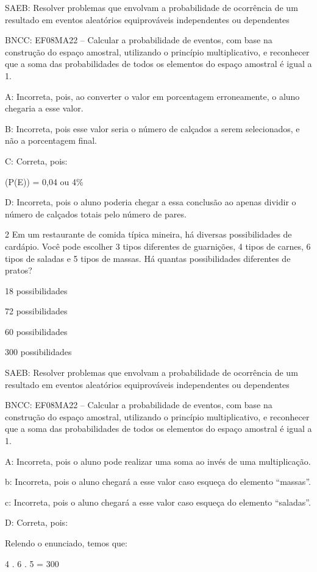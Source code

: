 {SAEB: Resolver problemas que envolvam a probabilidade de ocorrência de
um resultado em eventos aleatórios equiprováveis independentes ou
dependentes

BNCC: EF08MA22 -- Calcular a probabilidade de eventos, com base na
construção do espaço amostral, utilizando o princípio multiplicativo, e
reconhecer que a soma das probabilidades de todos os elementos do espaço
amostral é igual a 1.

A: Incorreta, pois, ao converter o valor em porcentagem erroneamente, o
aluno chegaria a esse valor.

B: Incorreta, pois esse valor seria o número de calçados a serem
selecionados, e não a porcentagem final.

C: Correta, pois:

(P(E)) = 0,04 ou 4\%

D: Incorreta, pois o aluno poderia chegar a essa conclusão ao apenas
dividir o número de calçados totais pelo número de pares.

\num{2} Em um restaurante de comida típica mineira, há diversas
possibilidades de cardápio. Você pode escolher 3 tipos diferentes de
guarnições, 4 tipos de carnes, 6 tipos de saladas e 5 tipos de massas.
Há quantas possibilidades diferentes de pratos?
\item 18 possibilidades
\item 72 possibilidades
\item 60 possibilidades
\item 300 possibilidades

SAEB: Resolver problemas que envolvam a probabilidade de ocorrência de
um resultado em eventos aleatórios equiprováveis independentes ou
dependentes

BNCC: EF08MA22 -- Calcular a probabilidade de eventos, com base na
construção do espaço amostral, utilizando o princípio multiplicativo, e
reconhecer que a soma das probabilidades de todos os elementos do espaço
amostral é igual a 1.

A: Incorreta, pois o aluno pode realizar uma soma ao invés de uma
multiplicação.

b: Incorreta, pois o aluno chegará a esse valor caso esqueça do elemento
``massas''.

c: Incorreta, pois o aluno chegará a esse valor caso esqueça do elemento
``saladas''.

D: Correta, pois:

Relendo o enunciado, temos que:

4 . 6 . 5 = 300

}
